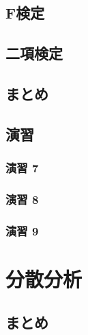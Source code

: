 \documentclass[
  12pt,
]{book}
\begin{document}
\hypertarget{fux691cux5b9a}{%
\subsection{F検定}\label{fux691cux5b9a}}

\hypertarget{ux4e8cux9805ux691cux5b9a}{%
\subsection{二項検定}\label{ux4e8cux9805ux691cux5b9a}}

\hypertarget{ux307eux3068ux3081-3}{%
\subsection{まとめ}\label{ux307eux3068ux3081-3}}

\hypertarget{ux6f14ux7fd2-7}{%
\subsection{演習}\label{ux6f14ux7fd2-7}}

\hypertarget{ux6f14ux7fd2-7-1}{%
\subsubsection*{演習 7}\label{ux6f14ux7fd2-7-1}}

\hypertarget{ux6f14ux7fd2-8}{%
\subsubsection*{演習 8}\label{ux6f14ux7fd2-8}}

\hypertarget{ux6f14ux7fd2-9}{%
\subsubsection*{演習 9}\label{ux6f14ux7fd2-9}}

\hypertarget{ux5206ux6563ux5206ux6790}{%
\section{分散分析}\label{ux5206ux6563ux5206ux6790}}

\hypertarget{ux307eux3068ux3081-4}{%
\subsection{まとめ}\label{ux307eux3068ux3081-4}}
\end{document}
